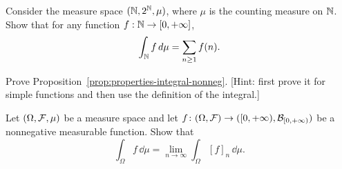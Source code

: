 \begin{problem}
%
%
%
\end{problem}

\begin{problem}
	Consider the measure space $(\mathbb N,2^{\mathbb N},\mu)$, where $\mu$ is the counting measure on $\mathbb N$. Show that for any function $f:\mathbb N\to[0,+\infty]$,
	\[
		\int_{\mathbb N} f\,d\mu = \sum_{n\ge 1} f(n).
	\]
\end{problem}

\begin{problem}\label{prb:properties-integral-nonneg}
Prove Proposition~\ref{prop:properties-integral-nonneg}. [Hint: first prove it for simple functions and then use the definition of the integral.]
\end{problem}

\begin{problem}
	\label{prb:simple-approx-integral}
 Let $(\Omega, \mathcal F, \mu)$ be a measure space and let $f\colon (\Omega,\mathcal F) \to ([0,+\infty), \mathcal B_{[0,+\infty)})$ be a nonnegative measurable function. Show that
\[
\int_\Omega f\, \dd \mu = \lim_{n \to \infty} \int_\Omega [f]_n\, \dd \mu.
\]	
\end{problem}


